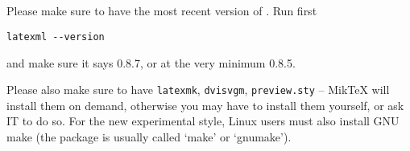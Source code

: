 \documentclass[a4paper]{article}
\theoremstyle{definition}
\begin{document}
\subsection{\texorpdfstring{\LaTeXML{}}{LaTeXML}}
Please make sure to have the most recent version of \LaTeXML{}. Run first
\begin{lstlisting}
latexml --version
\end{lstlisting}
and make sure it says 0.8.7, or at the very minimum 0.8.5.

Please also make sure to have \texttt{latexmk}, \texttt{dvisvgm}, \texttt{preview.sty} -- MikTeX will install them on demand, otherwise you may have to install them yourself, or ask IT to do so. For the new experimental style, Linux users must also install GNU make (the package is usually called `make' or `gnumake').
\end{document}
